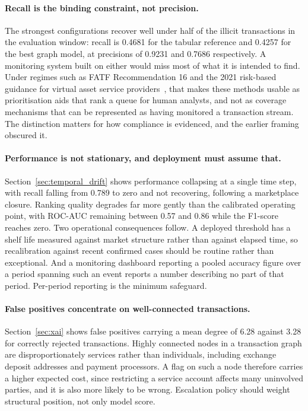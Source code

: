 \documentclass[12pt,a4paper]{article}
\begin{document}
\paragraph{Recall is the binding constraint, not precision.}
The strongest configurations recover well under half of the
illicit transactions in the evaluation window: recall is 0.4681
for the tabular reference and 0.4257 for the best graph model, at
precisions of 0.9231 and 0.7686 respectively. A monitoring system
built on either would miss most of what it is intended to find.
Under regimes such as FATF Recommendation 16 and the 2021
risk-based guidance for virtual asset service
providers~\citep{lo2023}, that makes these methods usable as
prioritisation aids that rank a queue for human analysts, and not
as coverage mechanisms that can be represented as having
monitored a transaction stream. The distinction matters for how
compliance is evidenced, and the earlier framing obscured it.

\paragraph{Performance is not stationary, and deployment must
assume that.}
Section~\ref{sec:temporal_drift} shows performance collapsing at
a single time step, with recall falling from 0.789 to zero and
not recovering, following a marketplace closure. Ranking quality
degrades far more gently than the calibrated operating point,
with ROC-AUC remaining between 0.57 and 0.86 while the F1-score
reaches zero. Two operational consequences follow. A deployed
threshold has a shelf life measured against market structure
rather than against elapsed time, so recalibration against recent
confirmed cases should be routine rather than exceptional. And a
monitoring dashboard reporting a pooled accuracy figure over a
period spanning such an event reports a number describing no part
of that period. Per-period reporting is the minimum safeguard.

\paragraph{False positives concentrate on well-connected
transactions.}
Section~\ref{sec:xai} shows false positives carrying a mean
degree of 6.28 against 3.28 for correctly rejected transactions.
Highly connected nodes in a transaction graph are
disproportionately services rather than individuals, including
exchange deposit addresses and payment processors. A flag on such
a node therefore carries a higher expected cost, since
restricting a service account affects many uninvolved parties,
and it is also more likely to be wrong. Escalation policy should
weight structural position, not only model score.
\end{document}
